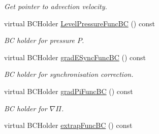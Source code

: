 \begin{DoxyCompactItemize}
\begin{DoxyCompactList}\small\item\em Get pointer to advection velocity. \end{DoxyCompactList}\item 
virtual B\-C\-Holder \hyperlink{class_phys_b_c_util_a62588222f0f6bf31efdab93760054077}{Level\-Pressure\-Func\-B\-C} () const 
\begin{DoxyCompactList}\small\item\em B\-C holder for pressure $ P $. \end{DoxyCompactList}\item 
virtual B\-C\-Holder \hyperlink{class_phys_b_c_util_a46b4a269ff7865055b6646575d11a600}{grad\-E\-Sync\-Func\-B\-C} () const 
\begin{DoxyCompactList}\small\item\em B\-C holder for synchronisation correction. \end{DoxyCompactList}\item 
\hypertarget{class_phys_b_c_util_a4d226e14d67824f313f3ff786c427c2d}{virtual B\-C\-Holder \hyperlink{class_phys_b_c_util_a4d226e14d67824f313f3ff786c427c2d}{grad\-Pi\-Func\-B\-C} () const }\label{class_phys_b_c_util_a4d226e14d67824f313f3ff786c427c2d}

\begin{DoxyCompactList}\small\item\em B\-C holder for $ \nabla \Pi $. \end{DoxyCompactList}\item 
\hypertarget{class_phys_b_c_util_a22628a8b9351997d1c753147765b7279}{virtual B\-C\-Holder \hyperlink{class_phys_b_c_util_a22628a8b9351997d1c753147765b7279}{extrap\-Func\-B\-C} () const }\label{class_phys_b_c_util_a22628a8b9351997d1c753147765b7279}


\end{DoxyCompactItemize}
